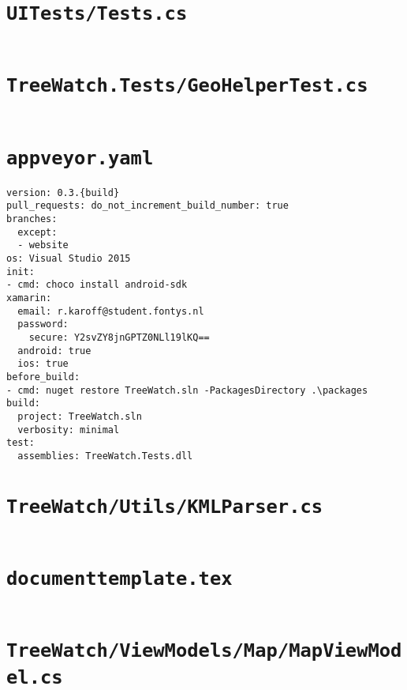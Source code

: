 \documentclass[12pt]{article}
\begin{document}
\section{\texttt{UITests/Tests.cs}}
	\inputminted[linenos,firstline=22]{csharp}{../../../src/UITests/Tests.cs}
	\pagebreak

\section{\texttt{TreeWatch.Tests/GeoHelperTest.cs}}
	\inputminted[linenos,firstline=22]{csharp}{../../../src/TreeWatch.Tests/GeoHelperTest.cs}
	\pagebreak
	
\section{\texttt{appveyor.yaml}}
\begin{verbatim}
version: 0.3.{build}
pull_requests: do_not_increment_build_number: true
branches:
  except:
  - website
os: Visual Studio 2015
init:
- cmd: choco install android-sdk
xamarin:
  email: r.karoff@student.fontys.nl
  password:
    secure: Y2svZY8jnGPTZ0NLl19lKQ==
  android: true
  ios: true
before_build:
- cmd: nuget restore TreeWatch.sln -PackagesDirectory .\packages
build:
  project: TreeWatch.sln
  verbosity: minimal
test:
  assemblies: TreeWatch.Tests.dll
\end{verbatim}
	\pagebreak
	
\section{\texttt{TreeWatch/Utils/KMLParser.cs}}
	\inputminted[linenos,firstline=22]{csharp}{../../../src/TreeWatch/Utils/KMLParser.cs}
	\pagebreak

\section{\texttt{documenttemplate.tex}}
	\inputminted[linenos,firstline=22]{tex}{../qualitymanagementplan/template/documenttemplate.tex}
	\pagebreak
	
\section{\texttt{TreeWatch/ViewModels/Map/MapViewModel.cs}}
	\inputminted[linenos,firstline=22]{csharp}{../../../src/TreeWatch/ViewModels/Map/MapViewModel.cs}
	\pagebreak
\end{document}

